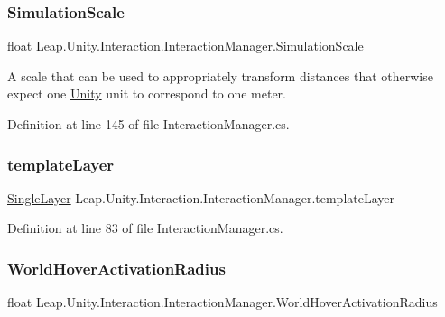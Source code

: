 \subsubsection{\texorpdfstring{SimulationScale}{SimulationScale}}
{\footnotesize\ttfamily float Leap.\+Unity.\+Interaction.\+Interaction\+Manager.\+Simulation\+Scale\hspace{0.3cm}{\ttfamily [get]}}



A scale that can be used to appropriately transform distances that otherwise expect one \mbox{\hyperlink{namespace_leap_1_1_unity}{Unity}} unit to correspond to one meter. 



Definition at line 145 of file Interaction\+Manager.\+cs.

\mbox{\label{class_leap_1_1_unity_1_1_interaction_1_1_interaction_manager_a08c617c31954540a87088b1b65250859}} 
\subsubsection{\texorpdfstring{templateLayer}{templateLayer}}
{\footnotesize\ttfamily \mbox{\hyperlink{struct_leap_1_1_unity_1_1_single_layer}{Single\+Layer}} Leap.\+Unity.\+Interaction.\+Interaction\+Manager.\+template\+Layer\hspace{0.3cm}{\ttfamily [get]}}



Definition at line 83 of file Interaction\+Manager.\+cs.

\mbox{\label{class_leap_1_1_unity_1_1_interaction_1_1_interaction_manager_a36150064a656dc0d048f5d234b8ff88f}} 
\subsubsection{\texorpdfstring{WorldHoverActivationRadius}{WorldHoverActivationRadius}}
{\footnotesize\ttfamily float Leap.\+Unity.\+Interaction.\+Interaction\+Manager.\+World\+Hover\+Activation\+Radius\hspace{0.3cm}{\ttfamily [get]}}



